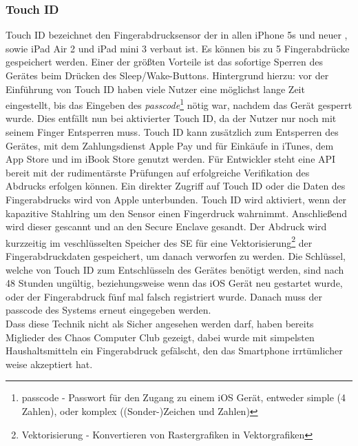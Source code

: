 	\subsubsection{Touch ID}\label{sec:touch_id}
		Touch ID bezeichnet den Fingerabdrucksensor der in allen iPhone 5s und neuer
		, sowie iPad Air 2 und iPad mini 3 verbaut ist. Es können bis zu 5
		Fingerabdrücke gespeichert werden. Einer der größten Vorteile ist das
		sofortige Sperren des Gerätes beim Drücken des Sleep/Wake-Buttons.
		Hintergrund hierzu: vor der Einführung von Touch ID haben viele Nutzer eine
		möglichst lange Zeit eingestellt, bis das Eingeben des \textsl{passcode}\footnote{passcode -
		Passwort für den Zugang zu einem iOS Gerät, entweder simple (4 Zahlen), oder
		komplex ((Sonder-)Zeichen und Zahlen)} nötig war, nachdem das Gerät gesperrt
		wurde. Dies entfällt nun bei aktivierter Touch ID, da der Nutzer nur noch mit
		seinem Finger Entsperren muss.
		Touch ID kann zusätzlich zum Entsperren des Gerätes, mit dem Zahlungsdienst
		Apple Pay und für Einkäufe in iTunes, dem App Store und im iBook Store genutzt
		werden. Für Entwickler steht eine API bereit mit der rudimentärste
		Prüfungen auf erfolgreiche Verifikation des Abdrucks erfolgen können. Ein
		direkter Zugriff auf Touch ID oder die Daten des Fingerabdrucks wird von
		Apple unterbunden. Touch ID wird aktiviert, wenn der kapazitive Stahlring um
		den Sensor einen Fingerdruck wahrnimmt. Anschließend wird dieser gescannt und
		an den Secure Enclave gesandt. Der Abdruck wird kurzzeitig im veschlüsselten
		Speicher des SE für eine Vektorisierung\footnote{Vektorisierung - Konvertieren
		von Rastergrafiken in Vektorgrafiken} der Fingerabdruckdaten gespeichert, um
		danach verworfen zu werden.
		Die Schlüssel, welche von Touch ID zum Entschlüsseln des Gerätes benötigt
		werden, sind nach 48 Stunden ungültig, beziehungsweise wenn das iOS Gerät neu
		gestartet wurde, oder der Fingerabdruck fünf mal falsch registriert wurde.
		Danach muss der passcode des Systems erneut eingegeben werden.\\
		Dass diese Technik nicht als Sicher angesehen werden darf, haben bereits
		Miglieder des Chaos Computer Club gezeigt\cite{CCCBreakTouch2015}, dabei 
		wurde mit simpelsten Haushaltsmitteln ein Fingerabdruck gefälscht, den das
		Smartphone irrtümlicher weise akzeptiert hat.
